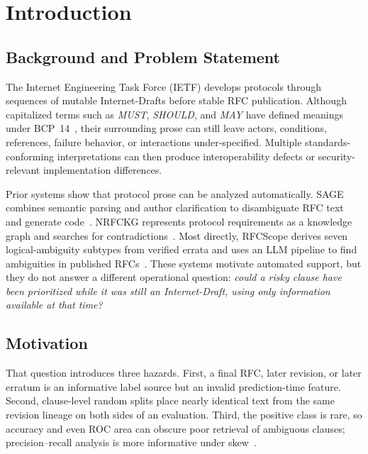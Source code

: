 \documentclass[12pt,a4paper,oneside]{report}
\begin{document}
\tableofcontents
\listoffigures
\listoftables
\clearpage
{}

\chapter{Introduction}

\section{Background and Problem Statement}

The Internet Engineering Task Force (IETF) develops protocols through sequences of mutable Internet-Drafts before stable RFC publication. Although capitalized terms such as \emph{MUST}, \emph{SHOULD}, and \emph{MAY} have defined meanings under BCP~14~\cite{rfc2119,rfc8174}, their surrounding prose can still leave actors, conditions, references, failure behavior, or interactions under-specified. Multiple standards-conforming interpretations can then produce interoperability defects or security-relevant implementation differences.

Prior systems show that protocol prose can be analyzed automatically. SAGE combines semantic parsing and author clarification to disambiguate RFC text and generate code~\cite{yen2021sage}. NRFCKG represents protocol requirements as a knowledge graph and searches for contradictions~\cite{feng2023nrfckg}. Most directly, RFCScope derives seven logical-ambiguity subtypes from verified errata and uses an LLM pipeline to find ambiguities in published RFCs~\cite{pawagi2025rfcscope}. These systems motivate automated support, but they do not answer a different operational question: \emph{could a risky clause have been prioritized while it was still an Internet-Draft, using only information available at that time?}

\section{Motivation}

That question introduces three hazards. First, a final RFC, later revision, or later erratum is an informative label source but an invalid prediction-time feature. Second, clause-level random splits place nearly identical text from the same revision lineage on both sides of an evaluation. Third, the positive class is rare, so accuracy and even ROC area can obscure poor retrieval of ambiguous clauses; precision--recall analysis is more informative under skew~\cite{davis2006pr,saito2015pr}.
\end{document}
